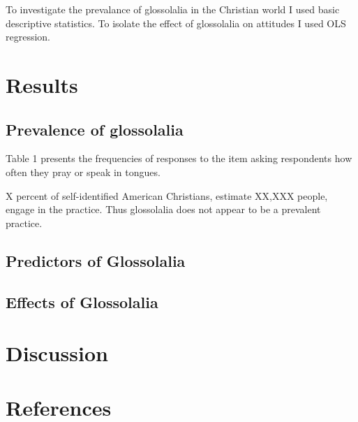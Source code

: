 \documentclass[
  letterpaper,
  DIV=11,
  numbers=noendperiod]{scrreprt}
\newlength{\cslhangindent}
\newenvironment{CSLReferences}[2] %
 {\begin{list}{}{%
  \setlength{\itemindent}{0pt}
  \setlength{\leftmargin}{0pt}
  \setlength{\parsep}{0pt}
  \ifodd #1
   \setlength{\leftmargin}{\cslhangindent}
   \setlength{\itemindent}{-1\cslhangindent}
  \fi
  \setlength{\itemsep}{#2\baselineskip}}}
 {\end{list}}
\begin{document}

To investigate the prevalance of glossolalia in the Christian world I
used basic descriptive statistics. To isolate the effect of glossolalia
on attitudes I used OLS regression.


\chapter*{Results}\label{results}


\section*{Prevalence of glossolalia}\label{prevalence-of-glossolalia}


Table 1 presents the frequencies of responses to the item asking
respondents how often they pray or speak in tongues.

X percent of self-identified American Christians, estimate XX,XXX
people, engage in the practice. Thus glossolalia does not appear to be a
prevalent practice.

\section*{Predictors of Glossolalia}\label{predictors-of-glossolalia}


\section*{Effects of Glossolalia}\label{effects-of-glossolalia}



\chapter*{Discussion}\label{discussion}



\chapter*{References}\label{references}


\label{refs}
\begin{CSLReferences}{0}{1}
\end{CSLReferences}
\end{document}
